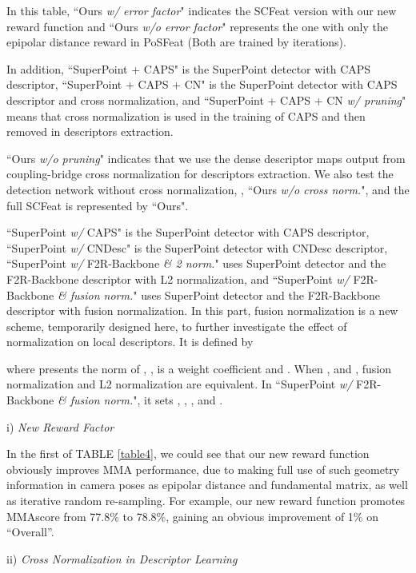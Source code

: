 \documentclass[journal]{IEEEtran}
\begin{document}
In this table, ``Ours \textit{w/ error factor}" indicates the SCFeat version with our new reward function and ``Ours \textit{w/o error factor}" represents the one with only the epipolar distance reward in PoSFeat \cite{li2022decoupling} (Both are trained by  iterations).

In addition, ``SuperPoint + CAPS" is the SuperPoint \cite{SuperPoint} detector with CAPS \cite{caps} descriptor, ``SuperPoint + CAPS + CN" is the SuperPoint detector with CAPS descriptor and cross normalization,
and ``SuperPoint + CAPS + CN \textit{w/ pruning}" means that cross normalization is used in the training of CAPS and then removed in descriptors extraction.


``Ours \textit{w/o pruning}" indicates that we use the dense descriptor maps output from coupling-bridge cross normalization for descriptors extraction. We also test the detection network without cross normalization, , ``Ours \textit{w/o cross norm.}", and the full SCFeat is represented by ``Ours".


``SuperPoint \textit{w/} CAPS" is the SuperPoint detector with CAPS descriptor, ``SuperPoint \textit{w/} CNDesc" is the SuperPoint detector with CNDesc \cite{cndesc} descriptor, ``SuperPoint \textit{w/} F2R-Backbone \textit{\& 2 norm.}" uses SuperPoint detector and the F2R-Backbone descriptor with L2 normalization, and ``SuperPoint \textit{w/} F2R-Backbone \textit{\& fusion norm.}" uses SuperPoint detector and the F2R-Backbone descriptor with fusion normalization. In this part, fusion normalization is a new scheme, temporarily designed here, to further investigate the effect of  normalization on local descriptors. It is defined by

where  presents the  norm of , ,  is a weight coefficient and .
When ,  and , fusion normalization and L2 normalization are equivalent. In ``SuperPoint \textit{w/} F2R-Backbone \textit{\& fusion norm.}", it sets , , ,  and .



i) \emph{New Reward Factor}  


In the first of TABLE \ref{table4}, we could see that our new reward function obviously improves MMA performance, due to making full use of such geometry information in camera poses as epipolar distance and fundamental matrix, as well as iterative random re-sampling. For example, our new reward function promotes MMAscore from 77.8\% to 78.8\%, gaining an obvious improvement of 1\% on ``Overall''. 

ii) \emph{Cross Normalization in Descriptor Learning}
\end{document}
